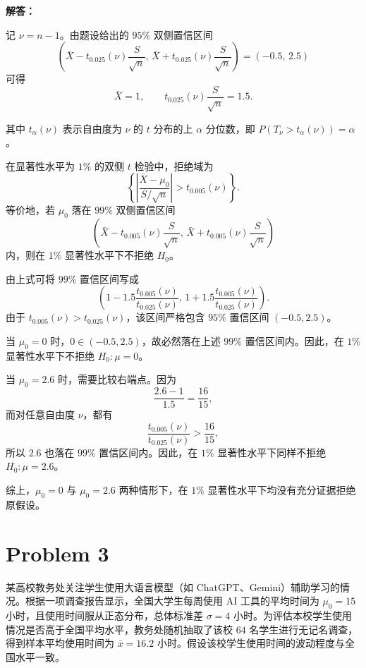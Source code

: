 \documentclass[12pt,a4paper]{article}
\begin{document}
\begin{answerbox}
\textbf{解答：}

记 $\nu=n-1$。由题设给出的 $95\%$ 双侧置信区间
$$
\left(\bar X-t_{0.025}(\nu)\frac{S}{\sqrt n},\,
\bar X+t_{0.025}(\nu)\frac{S}{\sqrt n}\right)=(-0.5,\,2.5)
$$
可得
$$
\bar X=1,\qquad
t_{0.025}(\nu)\frac{S}{\sqrt n}=1.5.
$$

其中 $t_\alpha(\nu)$ 表示自由度为 $\nu$ 的 $t$ 分布的上 $\alpha$ 分位数，即
$P(T_\nu>t_\alpha(\nu))=\alpha$。

在显著性水平为 $1\%$ 的双侧 $t$ 检验中，拒绝域为
$$
\left\{
\left|\frac{\bar X-\mu_0}{S/\sqrt n}\right|
>t_{0.005}(\nu)
\right\}.
$$
等价地，若 $\mu_0$ 落在 $99\%$ 双侧置信区间
$$
\left(
\bar X-t_{0.005}(\nu)\frac{S}{\sqrt n},\,
\bar X+t_{0.005}(\nu)\frac{S}{\sqrt n}
\right)
$$
内，则在 $1\%$ 显著性水平下不拒绝 $H_0$。

由上式可将 $99\%$ 置信区间写成
$$
\left(
1-1.5\frac{t_{0.005}(\nu)}{t_{0.025}(\nu)},\,
1+1.5\frac{t_{0.005}(\nu)}{t_{0.025}(\nu)}
\right).
$$
由于 $t_{0.005}(\nu)>t_{0.025}(\nu)$，该区间严格包含 $95\%$ 置信区间 $(-0.5,2.5)$。

当 $\mu_0=0$ 时，$0\in(-0.5,2.5)$，故必然落在上述 $99\%$ 置信区间内。因此，在 $1\%$ 显著性水平下不拒绝 $H_0:\mu=0$。

当 $\mu_0=2.6$ 时，需要比较右端点。因为
$$
\frac{2.6-1}{1.5}=\frac{16}{15},
$$
而对任意自由度 $\nu$，都有
$$
\frac{t_{0.005}(\nu)}{t_{0.025}(\nu)}>\frac{16}{15},
$$
所以 $2.6$ 也落在 $99\%$ 置信区间内。因此，在 $1\%$ 显著性水平下同样不拒绝 $H_0:\mu=2.6$。

综上，$\mu_0=0$ 与 $\mu_0=2.6$ 两种情形下，在 $1\%$ 显著性水平下均没有充分证据拒绝原假设。

\end{answerbox}

\section{Problem 3}

某高校教务处关注学生使用大语言模型（如 ChatGPT、Gemini）辅助学习的情况。根据一项调查报告显示，全国大学生每周使用 AI 工具的平均时间为 $\mu_0=15$ 小时，且使用时间服从正态分布，总体标准差 $\sigma=4$ 小时。为评估本校学生使用情况是否高于全国平均水平，教务处随机抽取了该校 $64$ 名学生进行无记名调查，得到样本平均使用时间为 $\bar x=16.2$ 小时。假设该校学生使用时间的波动程度与全国水平一致。

\subsection{}
\end{document}
